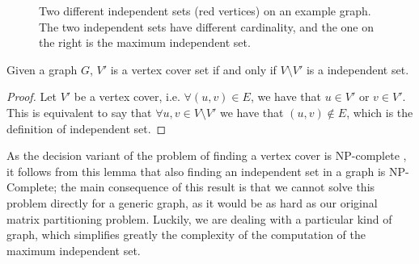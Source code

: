 \begin{figure}[h]
	\centering
{}
	\caption{Two different independent sets (red vertices) on an example graph. The two independent sets have different cardinality, and the one on the right is the maximum independent set.} \label{fig:is_example}
\end{figure}

\begin{lemma} 
	\label{lemma:is}
	Given a graph $G$, $V'$ is a vertex cover set if and only if $V \setminus V'$ is a independent set.
\end{lemma}
\begin{proof}
	Let $V'$ be a vertex cover, i.e. $\forall (u,v) \in E$, we have that $u \in V'$ or $v \in V'$. This is equivalent to say that $\forall u,v \in V \setminus V'$ we have that $(u,v) \notin E$, which is the definition of independent set.
\end{proof}
As the decision variant of the problem of finding a vertex cover is NP-complete \cite[Theorem 3.3]{np_book}, it follows from this lemma that also finding an independent set in a graph is NP-Complete; the main consequence of this result is that we cannot solve this problem directly for a generic graph, as it would be as hard as our original matrix partitioning problem. Luckily, we are dealing with a particular kind of graph, which simplifies greatly the complexity of the computation of the maximum independent set.

